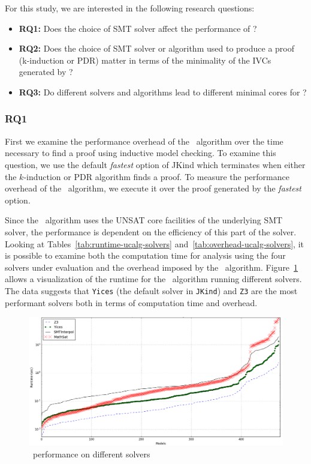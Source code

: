 For this study, we are interested in the following research questions:
\begin{itemize}
  \item \textbf{RQ1:} Does the choice of SMT solver affect the performance of \ucalg ?
  \item \textbf{RQ2:} Does the choice of SMT solver or algorithm used to produce a proof
(k-induction or PDR) matter in terms of the minimality of the IVCs generated by \ucalg ?
  \item \textbf{RQ3:} Do different solvers and algorithms
lead to different minimal cores for \ucalg ?
\end{itemize}

\vspace{0.1in}
\subsubsection{RQ1}
First we examine the performance overhead of the \ucalg\ algorithm over the time necessary to find a proof using inductive model checking.  To examine this question, we use the default {\em fastest} option of JKind which terminates when either the $k$-induction or PDR algorithm finds a proof.  To measure the performance overhead of the \ucalg\ algorithm, we execute it over the proof generated by the {\em fastest} option.

Since the \ucalg\ algorithm uses the UNSAT core facilities of the
underlying SMT solver, the performance is dependent on the efficiency
of this part of the solver. Looking at Tables~\ref{tab:runtime-ucalg-solvers}
and~\ref{tab:overhead-ucalg-solvers}, it is possible to examine both the
computation time for analysis using the four solvers under evaluation
and the overhead imposed by the \ucalg\ algorithm.
Figure~\ref{fig:perf-solvers} allows a visualization of the runtime for
the \ucalg\ algorithm running different solvers. The data suggests that
\texttt{Yices} (the default solver in \texttt{JKind}) and \texttt{Z3} are the most performant
solvers both in terms of computation time and overhead.

\begin{figure}
  \centering
  \includegraphics[width=\textwidth]{figs/performance_solvers.png}
    \vspace{-0.1in}
  \caption{\ucalg\ performance on different solvers}
  \label{fig:perf-solvers}
\end{figure}

